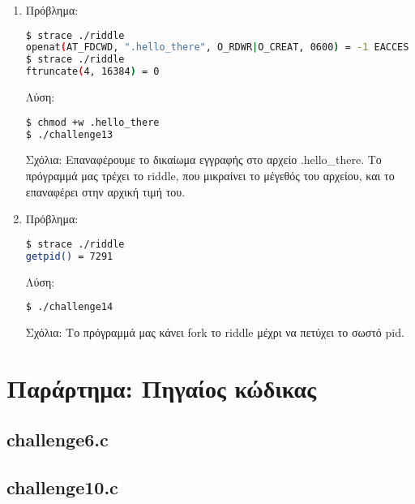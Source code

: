 \documentclass[12pt,titlepage]{article}
\newcommand{\en}{\textlatin}
\begin{document}
\begin{enumerate}
\item

Πρόβλημα:

\latintext
\begin{lstlisting}[language=bash]
$ strace ./riddle
openat(AT_FDCWD, ".hello_there", O_RDWR|O_CREAT, 0600) = -1 EACCES (Permission denied)
$ strace ./riddle
ftruncate(4, 16384) = 0
\end{lstlisting}
\greektext

Λύση:

\latintext
\begin{lstlisting}[language=bash]
$ chmod +w .hello_there
$ ./challenge13
\end{lstlisting}
\greektext

Σχόλια: Επαναφέρουμε το δικαίωμα εγγραφής στο αρχείο \en{.hello_there}. Το πρόγραμμά μας τρέχει το \en{riddle}, που μικραίνει το μέγεθός του αρχείου, και το επαναφέρει στην αρχική τιμή του.

\item

Πρόβλημα:

\latintext
\begin{lstlisting}[language=bash]
$ strace ./riddle
getpid() = 7291
\end{lstlisting}
\greektext

Λύση:

\latintext
\begin{lstlisting}[language=bash]
$ ./challenge14
\end{lstlisting}
\greektext

Σχόλια: Το πρόγραμμά μας κάνει \en{fork} το \en{riddle} μέχρι να πετύχει το σωστό \en{pid}.

\end{enumerate}

\section{Παράρτημα: Πηγαίος κώδικας}

\latintext

\subsection{\textlatin{challenge6.c}}



\subsection{\textlatin{challenge10.c}}
\end{document}

